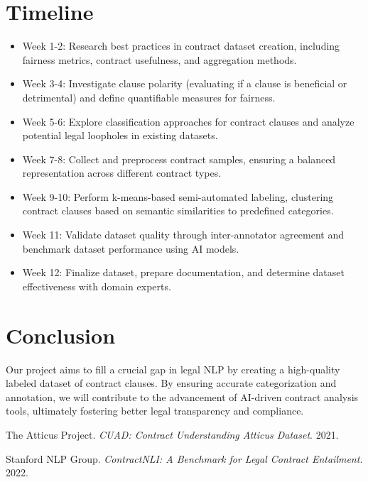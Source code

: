 \documentclass[11pt, oneside]{article}   	%
\begin{document}
\section*{Timeline}
\begin{itemize}
\item Week 1-2: Research best practices in contract dataset creation, including fairness metrics, contract usefulness, and aggregation methods.
\item Week 3-4: Investigate clause polarity (evaluating if a clause is beneficial or detrimental) and define quantifiable measures for fairness.
\item Week 5-6: Explore classification approaches for contract clauses and analyze potential legal loopholes in existing datasets.
\item Week 7-8: Collect and preprocess contract samples, ensuring a balanced representation across different contract types.
\item Week 9-10: Perform k-means-based semi-automated labeling, clustering contract clauses based on semantic similarities to predefined categories.
\item Week 11: Validate dataset quality through inter-annotator agreement and benchmark dataset performance using AI models.
\item Week 12: Finalize dataset, prepare documentation, and determine dataset effectiveness with domain experts.
\end{itemize}
\section*{Conclusion}
Our project aims to fill a crucial gap in legal NLP by creating a high-quality labeled dataset of contract clauses. By ensuring accurate categorization and annotation, we will contribute to the advancement of AI-driven contract analysis tools, ultimately fostering better legal transparency and compliance.

\begin{thebibliography}{9}

	The Atticus Project.
	\textit{CUAD: Contract Understanding Atticus Dataset}.
	2021.
	
	Stanford NLP Group.
	\textit{ContractNLI: A Benchmark for Legal Contract Entailment}.
	2022.
	
	\end{thebibliography}
\end{document}
